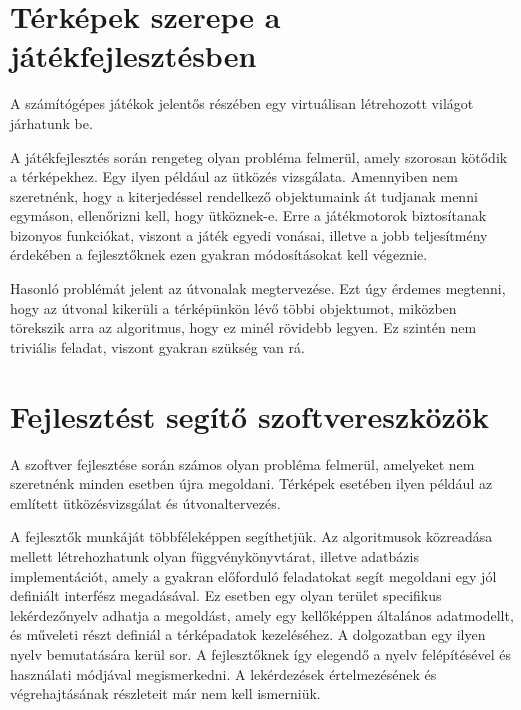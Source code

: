 
\section{Térképek szerepe a játékfejlesztésben}

A számítógépes játékok jelentős részében egy virtuálisan létrehozott világot járhatunk be.

A játékfejlesztés során rengeteg olyan probléma felmerül, amely szorosan kötődik a térképekhez. Egy ilyen például az ütközés vizsgálata. Amennyiben nem szeretnénk, hogy a kiterjedéssel rendelkező objektumaink át tudjanak menni egymáson, ellenőrizni kell, hogy ütköznek-e. Erre a játékmotorok biztosítanak bizonyos funkciókat, viszont a játék egyedi vonásai, illetve a jobb teljesítmény érdekében a fejlesztőknek ezen gyakran módosításokat kell végeznie.

Hasonló problémát jelent az útvonalak megtervezése. Ezt úgy érdemes megtenni, hogy az útvonal kikerüli a térképünkön lévő többi objektumot, miközben törekszik arra az algoritmus, hogy ez minél rövidebb legyen. Ez szintén nem triviális feladat, viszont gyakran szükség van rá.

\section{Fejlesztést segítő szoftvereszközök}

A szoftver fejlesztése során számos olyan probléma felmerül, amelyeket nem szeretnénk minden esetben újra megoldani. Térképek esetében ilyen például az említett ütközésvizsgálat és útvonaltervezés.

A fejlesztők munkáját többféleképpen segíthetjük. Az algoritmusok közreadása mellett létrehozhatunk olyan függvénykönyvtárat, illetve adatbázis implementációt, amely a gyakran előforduló feladatokat segít megoldani egy jól definiált interfész megadásával. Ez esetben egy olyan terület specifikus lekérdezőnyelv adhatja a megoldást, amely egy kellőképpen általános adatmodellt, és műveleti részt definiál a térképadatok kezeléséhez. A dolgozatban egy ilyen nyelv bemutatására kerül sor. A fejlesztőknek így elegendő a nyelv felépítésével és használati módjával megismerkedni. A lekérdezések értelmezésének és végrehajtásának részleteit már nem kell ismerniük.
